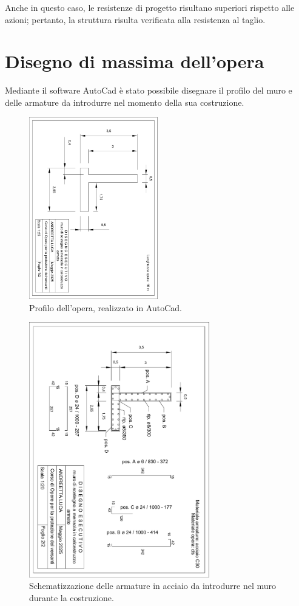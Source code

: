 Anche in questo caso, le resistenze di progetto risultano superiori rispetto alle azioni; pertanto, la struttura risulta verificata alla resistenza al taglio.

\section{Disegno di massima dell'opera}
Mediante il software AutoCad è stato possibile disegnare il profilo del muro e delle armature da introdurre nel momento della sua costruzione.
\begin{figure}[H]
    \centering
    \includegraphics[width=0.5\textwidth, angle=90]{immagini/disegno_muro_cad.pdf} \hfill
        \caption{Profilo dell'opera, realizzato in AutoCad.}
    \label{figure:disegno_cad}
\end{figure}

\begin{figure}[H]
    \centering
    \includegraphics[width=0.7\textwidth, angle=90]{immagini/disegno_armatura_cad.pdf} \hfill
        \caption{Schematizzazione delle armature in acciaio da introdurre nel muro durante la costruzione.}
    \label{figure:stati_limit_strutturali}
\end{figure}